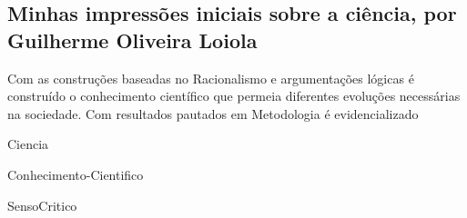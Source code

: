 \subsection{Minhas impressões iniciais sobre a ciência, por Guilherme Oliveira Loiola}

Com as construções baseadas no \gls{Racionalismo} e argumentações lógicas é construído o conhecimento científico que permeia diferentes evoluções necessárias na sociedade. Com resultados pautados em \gls{Metodologia} é evidencializado 

\citet{santa_soriano_bibliometric_2018}

\citet{frickel_new_2006}


\gls{Ciencia}

\gls{Conhecimento-Cientifico}

\gls{SensoCritico}

